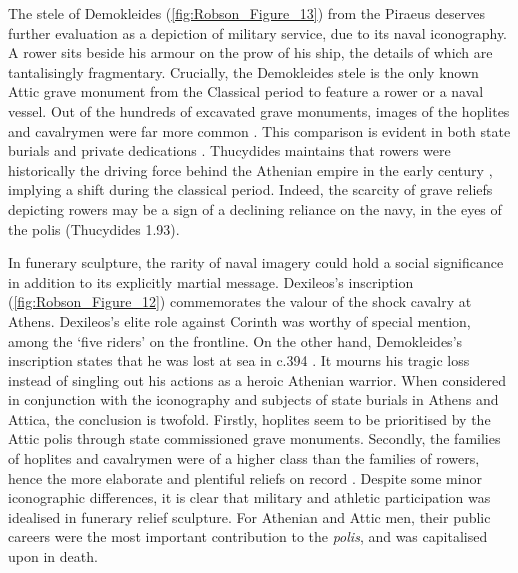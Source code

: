 The stele of Demokleides (\ref{fig:Robson_Figure_13}) from the Piraeus deserves further evaluation as a depiction of military service, due to its naval iconography. A rower sits beside his armour on the prow of his ship, the details of which are tantalisingly fragmentary.
Crucially, the Demokleides stele is the only known Attic grave monument from the Classical period to feature a rower or a naval vessel. Out of the hundreds of excavated grave monuments, images of the hoplites and cavalrymen were far more common \parencite[97]{Stupperich1994}.
This comparison is evident in both state burials and private dedications \parencite[97]{Stupperich1994}. Thucydides maintains that rowers were historically the driving force behind the Athenian empire in the early  century \BC, implying a shift during the classical period. Indeed, the scarcity of grave reliefs depicting rowers may be a sign of a declining reliance on the navy, in the eyes of the polis (Thucydides 1.93).

In funerary sculpture, the rarity of naval imagery could hold a social significance in addition to its explicitly martial message. Dexileos’s inscription (\ref{fig:Robson_Figure_12}) commemorates the valour of the shock cavalry at Athens.
Dexileos’s elite role against Corinth was worthy of special mention, among the \enquote*{five riders} on the frontline. On the other hand, Demokleides’s inscription states that he was lost at sea in c.394 \BC \parencite[197]{Wasserman1969}.
It mourns his tragic loss instead of singling out his actions as a heroic Athenian warrior. When considered in conjunction with the iconography and subjects of state burials in Athens and Attica, the conclusion is twofold. Firstly, hoplites seem to be prioritised by the Attic polis through state commissioned grave monuments. Secondly, the families of hoplites and cavalrymen were of a higher class than the families of rowers, hence the more elaborate and plentiful reliefs on record \parencite[97]{Stupperich1994}. Despite some minor iconographic differences, it is clear that military and athletic participation was idealised in funerary relief sculpture. For Athenian and Attic men, their public careers were the most important contribution to the \textit{polis}, and was capitalised upon in death.



